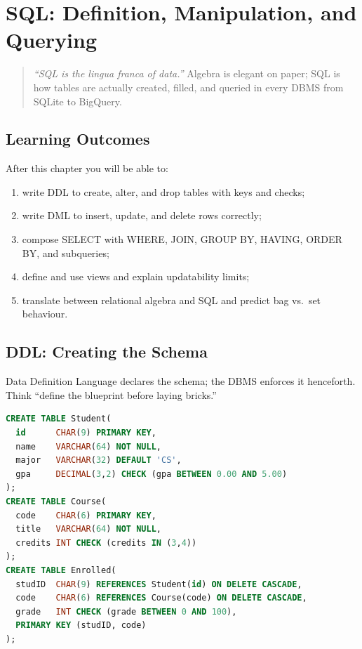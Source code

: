 \chapter{SQL: Definition, Manipulation, and Querying}
\label{ch:sql}

\begin{quote}
\emph{``SQL is the lingua franca of data.''} Algebra is elegant on paper; SQL is how tables are actually created, filled, and queried in every DBMS from SQLite to BigQuery.
\end{quote}

\noindent{}
\vspace{0.4em}

\section*{Learning Outcomes}
After this chapter you will be able to:
\begin{enumerate}[label=(L\arabic*)]
    \item write DDL to create, alter, and drop tables with keys and checks;
    \item write DML to insert, update, and delete rows correctly;
    \item compose SELECT with WHERE, JOIN, GROUP BY, HAVING, ORDER BY, and subqueries;
    \item define and use views and explain updatability limits;
    \item translate between relational algebra and SQL and predict bag vs.\ set behaviour.
\end{enumerate}

\section{DDL: Creating the Schema}
\label{sec:ddl}

Data Definition Language declares the schema; the DBMS enforces it henceforth. Think ``define the blueprint before laying bricks.''

\begin{lstlisting}[language=SQL, caption={DDL for NTU mini-schema}, label={lst:ddl}]
CREATE TABLE Student(
  id      CHAR(9) PRIMARY KEY,
  name    VARCHAR(64) NOT NULL,
  major   VARCHAR(32) DEFAULT 'CS',
  gpa     DECIMAL(3,2) CHECK (gpa BETWEEN 0.00 AND 5.00)
);
CREATE TABLE Course(
  code    CHAR(6) PRIMARY KEY,
  title   VARCHAR(64) NOT NULL,
  credits INT CHECK (credits IN (3,4))
);
CREATE TABLE Enrolled(
  studID  CHAR(9) REFERENCES Student(id) ON DELETE CASCADE,
  code    CHAR(6) REFERENCES Course(code) ON DELETE CASCADE,
  grade   INT CHECK (grade BETWEEN 0 AND 100),
  PRIMARY KEY (studID, code)
);
\end{lstlisting}

